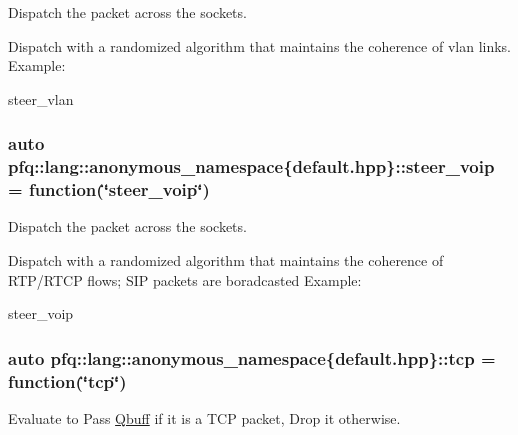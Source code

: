 Dispatch the packet across the sockets. 

Dispatch with a randomized algorithm that maintains the coherence of vlan links. Example\+:

steer\+\_\+vlan 
\subsubsection[{\texorpdfstring{steer\+\_\+voip}{steer_voip}}]{\setlength{\rightskip}{0pt plus 5cm}auto pfq\+::lang\+::anonymous\+\_\+namespace\{default.\+hpp\}\+::steer\+\_\+voip = {\bf function}(\char`\"{}steer\+\_\+voip\char`\"{})}\hypertarget{namespacepfq_1_1lang_1_1anonymous__namespace_02default_8hpp_03_a50fa612c45aa8f8dfd3259e2d0cbfce0}{}\label{namespacepfq_1_1lang_1_1anonymous__namespace_02default_8hpp_03_a50fa612c45aa8f8dfd3259e2d0cbfce0}


Dispatch the packet across the sockets. 

Dispatch with a randomized algorithm that maintains the coherence of R\+T\+P/\+R\+T\+CP flows; S\+IP packets are boradcasted Example\+:

steer\+\_\+voip 
\subsubsection[{\texorpdfstring{tcp}{tcp}}]{\setlength{\rightskip}{0pt plus 5cm}auto pfq\+::lang\+::anonymous\+\_\+namespace\{default.\+hpp\}\+::tcp = {\bf function}(\char`\"{}tcp\char`\"{})}\hypertarget{namespacepfq_1_1lang_1_1anonymous__namespace_02default_8hpp_03_a5b8ca91a33a120e7e0807e63c8b51b28}{}\label{namespacepfq_1_1lang_1_1anonymous__namespace_02default_8hpp_03_a5b8ca91a33a120e7e0807e63c8b51b28}


Evaluate to {\ttfamily Pass} \hyperlink{structpfq_1_1lang_1_1Qbuff}{Qbuff} if it is a T\+CP packet, {\ttfamily Drop} it otherwise. 


